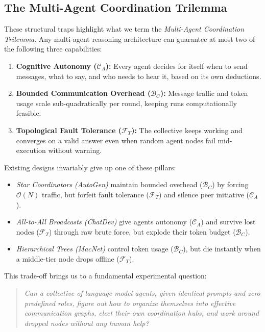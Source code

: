 \documentclass{ieeeaccess}
\begin{document}
\subsection{The Multi-Agent Coordination Trilemma}
These structural traps highlight what we term the \textit{Multi-Agent Coordination Trilemma}. Any multi-agent reasoning architecture can guarantee at most two of the following three capabilities:
\begin{enumerate}
    \item \textbf{Cognitive Autonomy ($\mathcal{C}_A$):} Every agent decides for itself when to send messages, what to say, and who needs to hear it, based on its own deductions.
    \item \textbf{Bounded Communication Overhead ($\mathcal{B}_C$):} Message traffic and token usage scale sub-quadratically per round, keeping runs computationally feasible.
    \item \textbf{Topological Fault Tolerance ($\mathcal{F}_T$):} The collective keeps working and converges on a valid answer even when random agent nodes fail mid-execution without warning.
\end{enumerate}

Existing designs invariably give up one of these pillars:
\begin{itemize}
    \item \textit{Star Coordinators (AutoGen)} maintain bounded overhead ($\mathcal{B}_C$) by forcing $\mathcal{O}(N)$ traffic, but forfeit fault tolerance ($\mathcal{F}_T$) and silence peer initiative ($\mathcal{C}_A$).
    \item \textit{All-to-All Broadcasts (ChatDev)} give agents autonomy ($\mathcal{C}_A$) and survive lost nodes ($\mathcal{F}_T$) through raw brute force, but explode their token budget ($\mathcal{B}_C$).
    \item \textit{Hierarchical Trees (MacNet)} control token usage ($\mathcal{B}_C$), but die instantly when a middle-tier node drops offline ($\mathcal{F}_T$).
\end{itemize}

This trade-off brings us to a fundamental experimental question:
\begin{quote}
\textit{Can a collective of language model agents, given identical prompts and zero predefined roles, figure out how to organize themselves into effective communication graphs, elect their own coordination hubs, and work around dropped nodes without any human help?}
\end{quote}
\end{document}
